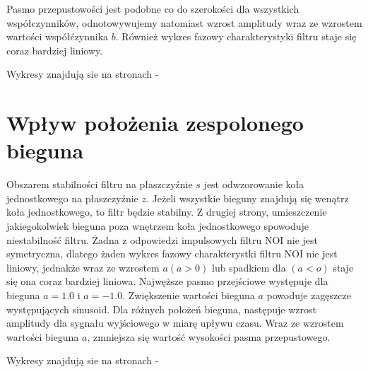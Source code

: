 \documentclass[wide,a4paper,titlepage,12pt]{mwart}
\begin{document}
	Pasmo przepustowości jest podobne co do szerokości dla wszystkich współczynników, odnotowywujemy natomiast wzrost amplitudy wraz ze wzrostem wartości współćzynnika $b$. Również wykres fazowy charakterystyki filtru staje się coraz bardziej liniowy.
	
	Wykresy znajdują sie na stronach \pageref{fig15}-\pageref{fig28}
	
	
	\section{Wpływ położenia zespolonego bieguna}
	Obszarem stabilności filtru na płaszczyźnie $s$ jest odwzorowanie koła jednostkowego na płaszczyźnie $z$. Jeżeli wszystkie bieguny znajdują się wenątrz koła jednostkowego, to filtr będzie stabilny. Z drugiej strony, umieszczenie jakiegokolwiek bieguna poza wnętrzem koła jednostkowego spowoduje niestabilność filtru. Żadna z odpowiedzi impulsowych filtru NOI nie jest symetryczna, dlatego żaden wykres fazowy charakterystki filtru NOI nie jest liniowy, jednakże wraz ze wzrostem $a (a>0)$ lub spadkiem dla $(a<o)$ staje się ona coraz bardziej liniowa. Najwęższe pasmo przejściowe występuje dla bieguna $a = 1.0$ i $a=-1.0$. Zwiększenie wartości bieguna $a$ powoduje zagęszcze występujących sinusoid. Dla różnych położeń bieguna, następuje wzrost amplitudy dla sygnału wyjściowego w miarę upływu czasu. Wraz ze wzrostem wartości bieguna $a$, zmniejsza się wartość wysokości pasma przepustowego.
	
	Wykresy znajdują sie na stronach \pageref{fig29}-\pageref{fig42}
	
	\pagebreak
\end{document}
